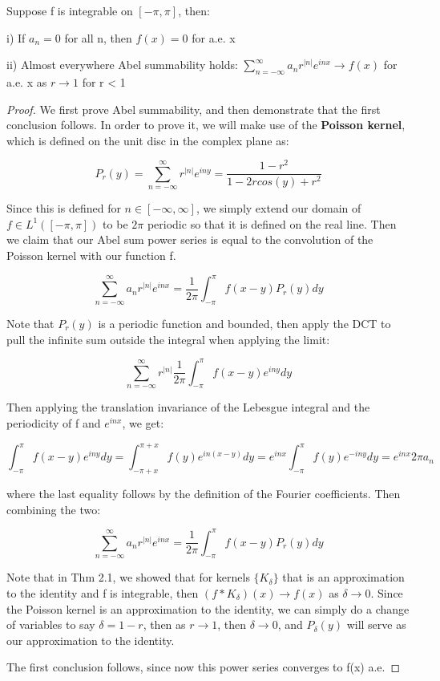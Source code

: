 \documentclass[class=article, crop=false]{standalone}
\begin{document}
		\begin{theorem} 
			Suppose f is integrable on $[-\pi, \pi]$, then:

			i) If $a_n = 0$ for all n, then $f(x) = 0$ for a.e. x

			ii) Almost everywhere Abel summability holds: $\sum_{n=-\infty}^\infty a_n r^{|n|}e^{inx} \rightarrow f(x)$ for a.e. x as $r \rightarrow 1$ for r < 1
		\end{theorem}
		\begin{proof}
			We first prove Abel summability, and then demonstrate that the first conclusion follows. In order to prove it, we will make use of the \textbf{Poisson kernel}, which is defined on the unit disc in the complex plane as:

				$$P_r(y) = \sum_{n=-\infty}^\infty r^{|n|}e^{iny} = \frac{1 - r^2}{1 - 2rcos(y) + r^2}$$

			Since this is defined for $n \in [-\infty, \infty]$, we simply extend our domain of $f \in L^1([-\pi, \pi])$ to be $2\pi$ periodic so that it is defined on the real line. Then we claim that our Abel sum power series is equal to the convolution of the Poisson kernel with our function f.

				$$\sum_{n=-\infty}^\infty a_n r^{|n|}e^{inx} = \frac{1}{2\pi} \int_{-\pi}^\pi f(x-y) P_r(y) dy$$

			Note that $P_r(y)$ is a periodic function and bounded, then apply the DCT to pull the infinite sum outside the integral when applying the limit:

				$$\sum_{n=-\infty}^\infty r^{|n|} \frac{1}{2\pi} \int_{-\pi}^\pi f(x-y) e^{iny} dy$$

			Then applying the translation invariance of the Lebesgue integral and the periodicity of f and $e^{inx}$, we get:

				$$\int_{-\pi}^\pi f(x-y) e^{iny} dy = \int_{-\pi + x}^{\pi + x} f(y) e^{in(x-y)} dy = e^{inx} \int_{-\pi}^\pi f(y) e^{-iny} dy = e^{inx} 2\pi a_n$$

			where the last equality follows by the definition of the Fourier coefficients. Then combining the two:

				$$\sum_{n=-\infty}^\infty a_n r^{|n|}e^{inx} = \frac{1}{2\pi} \int_{-\pi}^\pi f(x-y) P_r(y) dy$$

			Note that in Thm 2.1, we showed that for kernels $\{K_\delta\}$ that is an approximation to the identity and f is integrable, then $(f*K_\delta)(x) \rightarrow f(x)$ as $\delta \rightarrow 0$. Since the Poisson kernel is an approximation to the identity, we can simply do a change of variables to say $\delta = 1 - r$, then as $r \rightarrow 1$, then $\delta \rightarrow 0$, and $P_\delta(y)$ will serve as our approximation to the identity.

			The first conclusion follows, since now this power series converges to f(x) a.e.
		\end{proof}
\end{document}
